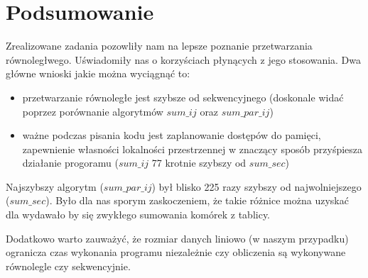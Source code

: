 \section{Podsumowanie}

Zrealizowane zadania pozowliły nam na lepsze poznanie przetwarzania równoległwego. Uświadomiły nas o korzyściach płynących z jego stosowania. Dwa główne wnioski jakie można wyciągnąć to:

\begin{itemize}
\item przetwarzanie równoległe jest szybsze od sekwencyjnego (doskonale widać poprzez porównanie algorytmów $sum\_ij$ oraz $sum\_par\_ij$)
\item ważne podczas pisania kodu jest zaplanowanie dostępów do pamięci, zapewnienie własności lokalności przestrzennej w znaczący sposób przyśpiesza działanie progoramu ($sum\_ij$ 77 krotnie szybszy od $sum\_sec$)
\end{itemize}

Najszybszy algorytm ($sum\_par\_ij$) był blisko 225 razy szybszy od najwolniejszego ($sum\_sec$). Było dla nas sporym zaskoczeniem, że takie różnice można uzyskać dla wydawało by się zwykłego sumowania komórek z tablicy.\newline

Dodatkowo warto zauważyć, że rozmiar danych liniowo (w naszym przypadku) ogranicza czas wykonania programu niezależnie czy obliczenia są wykonywane równolegle czy sekwencyjnie.
